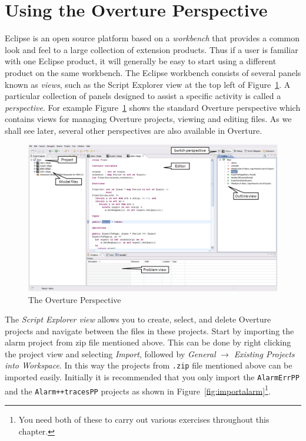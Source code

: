 \section{Using the Overture Perspective}\label{sec:vdmsupport}

Eclipse is an open source platform based on a \emph{workbench} that
provides a common look and feel to a large collection of extension
products. Thus if a user is familiar with one Eclipse product, it will
generally be easy to start using a different product on the same
workbench. The Eclipse workbench consists of several panels known as
\emph{views}, such as the Script Explorer view at the top left of
Figure~\ref{fig:OverturePerspective}. A particular
collection of panels designed to assist a specific activity is called
a \emph{perspective}. For example
Figure~\ref{fig:OverturePerspective} shows the standard
Overture perspective which contains views for managing Overture
projects, viewing and editing files. As we shall see later, several
other perspectives are also available in Overture.

\begin{figure}[!htb]
\begin{center}
  \includegraphics[width=5in]{figures/OverturePerspective}
  \caption[labelInTOC]{The Overture Perspective}
  \label{fig:OverturePerspective}
\end{center}
\end{figure}

The \emph{Script Explorer view} allows you to create, select, and
delete Overture projects and navigate between the files in these
projects. Start by importing the alarm project from zip file mentioned
above. This can be done by right clicking the project view
and selecting \emph{Import}, followed by \emph{General} $\rightarrow$
\emph{Existing Projects into Workspace}.  In this way the projects
from \texttt{.zip} file mentioned above can be imported easily. Initially it is
recommended that you only import the \texttt{AlarmErrPP} and the
\texttt{Alarm++tracesPP} projects as shown in
Figure~\ref{fig:importalarm}\footnote{You need both of these to
  carry out various exercises throughout this chapter.}.

